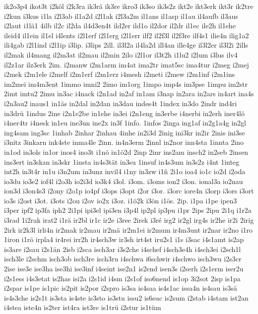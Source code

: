 {ik2o3p4
ikot3t
i2köl
i2k3ra
ik3rä
ik3re
ikro3
ik3so
ik3s2z
ikt2e
ikt3erk
ikt3r
ik2tre
i2kun
i3kus
i1la
i2l3ab
il1a2d
i2l1ak
i2l3a2m
il1ans
il1asp
il1au
il4aufb
il3aus
i2laut
i1lä1
4ilb
il2c
il2da
il4d3en4t
ild2er
ild1o
il2dor
il2dr
il1ec
ile2h
il1ehe
ileid4
il1ein
il1el
i4lents
i2l1erf
i2l1erg
i2l1err
ilf2
il2f3l
il2f3re
ilf4s1
ilie4n
ilig1a2
ili4gab
i2l1ind
i2l1ip
i3lip.
i3lips
2ill.
il3l2a
il4la2d
ill4an
ille4ge
il3l2er
il3l2i
2ills
il2mak
il4mang
il2m3at
il2mau
il2min
2ilo
i2l1or
il3t2h
i1lu2
i2lum
i3lus
ilv4
il2z1ar
ilz3erk
2im.
i2manw
i2m1arm
im4at
ima2tr
imat5sc
ima4tur
i2meg
i2mej
i2mek
i2m1ele
i2melf
i2m1erf
i2m1erz
i4mesh
i2meti
i2mew
i2m1inf
i2m1ins
im2mei
im4m3ent
1immo
imni2
2imo
im1org
1impo
imp4s
im3pse
1impu
im2str
2imt
imtu2
2imu
in3ac
i4nack
i2n1ad
in2af
in1am
i3nap
in2ara
in2ars
in4art
ina4s
i2n3au2
inaus1
in1äs
in2dal
in2dan
in3dau
indes4t
1index
in3do
2indr
ind4ri
in3drü
1indus
2ine
i2n1e2be
in1ehe
in3ei
i2n1eng
in3erbe
i4nerbi
in2erh
iner4lö
i4ner4tr
i4nesk
in1eu
ine3un
ine2x
in3f
1info.
1infos
2inga
ing1af
in2g1a4g
in2gl
ing4sam
ing3sc
1inhab
2inhar
2inhau
4inhe
in2i3d
2inig
ini3kr
in2ir
2inis
ini3se
i3nitz
3inkarn
ink4ste
inma4le
2inn.
in4n3erm
2innl
in2nor
inn4sta
1innta
2ino
in1od
in3ols
in1or
inos4
ino3t
i1nö
in1ö2d
2inp
2inr
ins2am
insch2
in2seb
2insen
ins3ert
in3skan
in3skr
1insta
in4s3tät
in3su
1insuf
in4s3um
in3s2z
i4nt
1integ
int2h
in3t4r
in1u
i3n2um
in3unz
invil4
i1ny
in3zw
i1ñ
2i1o
ioa4
io1c
io2d
i2oda
io3du
io3e2
iof4l
i2o3h
io2i3d
io3k4
i3ol.
i3om.
i3oms
ion2
i3on.
ional3a
io2nau
ion3d
i3on4s3
i2ony
i2o1p
io4pf
i3ops
i3opt
i2or
i3or.
i3orc
iore4n
i3orp
i3ors
i3ort
io3s
i2ost
i3ot.
i3ots
i2ou
i2ov
io2x
i3oz.
i1ö2k
i3ön
i1ös.
2ip.
i1pa
i1pe
ipen3
i3per
ipf2
ip3fa
iph2
2i1pi
ipi3el
ipi3en
i3p4l
ip2pl
ip3pu
i1pr
2ips
2ipu
2i1q
i1r2a
i3rad
1i2rak
irat2
i1rä
ir2bl
ir1c
ir2e
i3ree
2irek
i3ré
irg2
ir2gl
irg4s
ir2he
ir2i
2irig
2irk
ir2k3l
irli4n
ir2mak
ir2mau
ir2mä
ir2m1ei
ir2mum
ir4m3unt
ir2nar
ir2no
i1ro
1iron
i1rö
irpla4
ir4rei
irr2h
ir4sch3w
ir3sh
irt4st
iru2s1
i1s
i3sac
i4s1amt
is2ap
is3are
i2sau
i2s1än
2isb
i2sca
isch3ar
i3s2che
i4schef
i4sch3e4h
i4sch3ei
i2sch1l
isch3le
i2schm
isch3ob
isch3re
isch3ru
i4schwa
i6schwir
i4schwo
isch3wu
i2s3cr
2ise
ise3e
ise3ha
ise3hi
ise3inf
i4seint
ise2n1
is2end
isen3s
i2serh
i2s1erm
iser2u
i2s1ess
i4s3etat
is2has
isi2a
i2s1id
i4sm
i2s1of
iso6nend
is1op
3i2sot
2isp
is1pa
i2spar
is1pe
is1pic
is2pit
is2por
i2spro
is3sa
is4saa
is4s1ac
issa4n
is4sau
is3sä
is4s3che
is2s1t
is3sta
is4ste
is3sto
is3stu
issu2
is6suc
is2sum
i2stab
i4stam
ist2an
i4stea
iste4n
is2ter
ist4ra
ist3re
is1trü
i2stur
is1tüm
}
